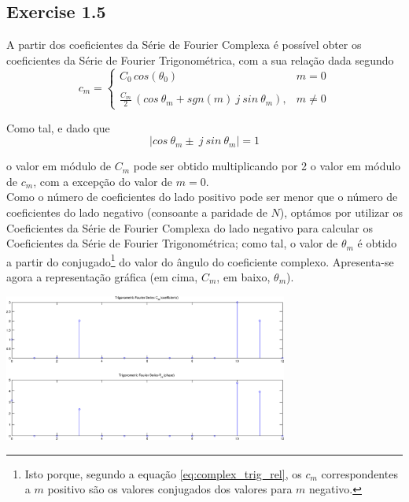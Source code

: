 \documentclass[a4paper]{article}
\begin{document}
\subsection{Exercise 1.5}
\label{subsec:ex_1_5}
\noindent A partir dos coeficientes da Série de Fourier Complexa é possível obter os coeficientes da Série de Fourier Trigonométrica, com a sua relação dada segundo
\begin{equation}
	c_m = \left\{
	\begin{array}{lr}
		C_0 \, cos(\theta_0) & m = 0 \\
		\, & \, \\
		\frac{C_m}{2} \, (cos~\theta_m + sgn(m)~j~sin~\theta_m), & m \neq 0
	\end{array}
	\right.
	\label{eq:complex_trig_rel}
\end{equation}

\noindent Como tal, e dado que
\begin{equation}
	|cos~\theta_m \pm~j~sin~\theta_m| = 1
\end{equation}

\noindent o valor em módulo de $C_m$ pode ser obtido multiplicando por 2 o valor em módulo de $c_m$, com a excepção do valor de $m = 0$.\\
Como o número de coeficientes do lado positivo pode ser menor que o número de coeficientes do lado negativo (consoante a paridade de $N$), optámos por utilizar os Coeficientes da Série de Fourier Complexa do lado negativo para calcular os Coeficientes da Série de Fourier Trigonométrica; como tal, o valor de $\theta_m$ é obtido a partir do conjugado\footnote{Isto porque, segundo a equação \ref{eq:complex_trig_rel}, os $c_m$ correspondentes a $m$ positivo são os valores conjugados dos valores para $m$ negativo.} do valor do ângulo do coeficiente complexo. Apresenta-se agora a representação gráfica (em cima, $C_m$, em baixo, $\theta_m$).
\begin{center}
	\includegraphics[width=0.70\textwidth]{images/ex_1_5.png}
	\label{fig:ex_1_5}
\end{center}
\end{document}
